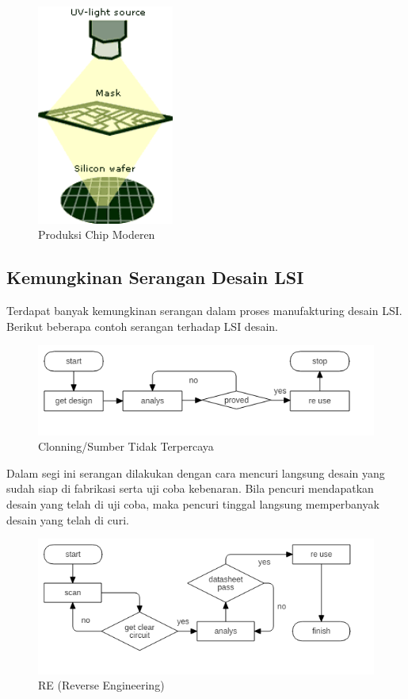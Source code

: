 \begin{figure}
	\centering
	\includegraphics[width=0.4\textwidth]
	{pics/steping.png}
	\caption{Produksi Chip Moderen}
	\label{fig:produksiChipModeren}
\end{figure}

\subsection{Kemungkinan Serangan Desain LSI}
Terdapat banyak kemungkinan serangan dalam proses manufakturing desain LSI. Berikut beberapa contoh serangan terhadap LSI desain.

\begin{figure}
	\centering
	\includegraphics[width=1.05\textwidth]
	{diagrams/untrustSource.png}
	\caption{Clonning/Sumber Tidak Terpercaya}
	\label{fig:untrustsource}
\end{figure}

Dalam segi ini serangan dilakukan dengan cara mencuri langsung desain yang sudah siap di fabrikasi serta uji coba kebenaran. Bila pencuri mendapatkan desain yang telah di uji coba, maka pencuri tinggal langsung memperbanyak desain yang telah di curi.

\begin{figure}
	\centering
	\includegraphics[width=1.05\textwidth]
	{diagrams/reverseEngineering.png}
	\caption{RE (Reverse Engineering)}
	\label{fig:reverseengineering}
\end{figure}

